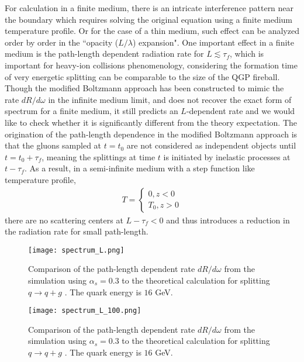 For calculation in a finite medium, there is an intricate interference pattern near the boundary which requires solving the original equation using a finite medium temperature profile. 
Or for the case of a thin medium, such effect can be analyzed order by order in the ``opacity ($L/\lambda$) expansion". 
One important effect in a finite medium is the path-length dependent radiation rate for $L \lesssim \tau_f$, which is important for heavy-ion collisions phenomenology, considering the formation time of very energetic splitting can be comparable to the size of the QGP fireball.
Though the modified Boltzmann approach has been constructed to mimic the rate $dR/d\omega$ in the infinite medium limit, and does not recover the exact form of spectrum for a finite medium, it still predicts an $L$-dependent rate and we would like to check whether it is significantly different from the theory expectation.
The origination of the path-length dependence in the modified Boltzmann approach is that the gluons sampled at $t=t_0$ are not considered as independent objects until $t = t_0+\tau_f$, meaning the splittings at time $t$ is initiated by inelastic processes at $t-\tau_f$.
As a result, in a semi-infinite medium with a step function like temperature profile, 
\begin{eqnarray}
T = \begin{cases}
0 , z<0\\
T_0, z>0
\end{cases}
\end{eqnarray}
there are no scattering centers at $L-\tau_f<0$ and thus introduces a reduction in the radiation rate for small path-length.

\begin{figure}
\texttt{[image: spectrum\_L.png]}
\caption{Comparison of the path-length dependent rate $dR/d\omega$ from the simulation using $\alpha_s = 0.3$ to the theoretical calculation for splitting $q\rightarrow q+g$ \cite{CaronHuot:2010bp}. The quark energy is $16$ GeV.}
\label{fig:spectra-L-alphas=0.3}
\end{figure}

\begin{figure}
\texttt{[image: spectrum\_L\_100.png]}
\caption{Comparison of the path-length dependent rate $dR/d\omega$ from the simulation using $\alpha_s = 0.3$ to the theoretical calculation for splitting $q\rightarrow q+g$ \cite{CaronHuot:2010bp}. The quark energy is $16$ GeV.}
\label{fig:spectra-L-alphas=0.3}
\end{figure}

